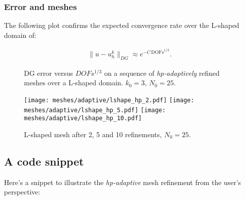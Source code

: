 \newpage
\subsubsection{Error and meshes}

\cite{Eibner2007} The following plot confirms the expected convergence rate over the L-shaped domain of:

\begin{gather}
    \lVert u - u^k_h \rVert_{DG} \approx e^{-C \, \text{DOFs}^{1/3}}.
\end{gather}

\begin{figure}[!ht]
    \centering
    
    \caption{DG error versus $DOFs^{1/3}$ on a sequence of \textit{hp-adaptively} refined meshes over a L-shaped domain. $k_0 = 3$, $N_0 = 25$.}
\end{figure}

\begin{figure}[!ht]
	\centering
	\texttt{[image: meshes/adaptive/lshape\_hp\_2.pdf]}
	\texttt{[image: meshes/adaptive/lshape\_hp\_5.pdf]}
	\texttt{[image: meshes/adaptive/lshape\_hp\_10.pdf]}
	\caption{L-shaped mesh after 2, 5 and 10 refinements, $N_0 = 25$.}
\end{figure}

\newpage
\subsection{A code snippet}

Here's a snippet to illustrate the \textit{hp-adaptive} mesh refinement from the user's perspective:

